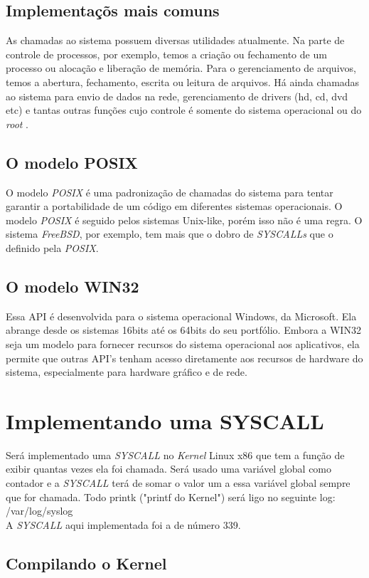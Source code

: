 \documentclass[12pt]{article}
\begin{document}
\subsection{Implementaçõs mais comuns} 
As chamadas ao sistema possuem diversas utilidades atualmente. Na parte de
controle de processos, por exemplo, temos a criação ou fechamento de um
processo ou alocação e liberação de memória. Para o gerenciamento de arquivos,
temos a abertura, fechamento, escrita ou leitura de arquivos. Há ainda chamadas
ao sistema para envio de dados na rede, gerenciamento de drivers (hd, cd, dvd
etc) e tantas outras funções cujo controle é somente do sistema operacional ou
do \textit{root} .

\subsection{O modelo POSIX}
O modelo \textit{POSIX} é uma padronização de chamadas do sistema para tentar garantir a
portabilidade de um código em diferentes sistemas operacionais. O modelo \textit{POSIX} é
seguido pelos sistemas Unix-like, porém isso não é uma regra. O sistema \textit{FreeBSD},
por exemplo, tem mais que o dobro de \textit{SYSCALLs} que o definido pela \textit{POSIX}.

\subsection{O modelo WIN32}
Essa API é desenvolvida para o sistema operacional Windows, da Microsoft. Ela
abrange desde os sistemas 16bits até os 64bits do seu portfólio.
Embora a WIN32 seja um modelo para fornecer recursos do sistema operacional aos
aplicativos, ela permite que outras API's tenham acesso diretamente aos recursos
de hardware do sistema, especialmente para hardware gráfico e de rede.

\section{Implementando uma SYSCALL}
Será implementado uma \textit{SYSCALL} no \textit{Kernel} Linux x86 que tem a função de
exibir quantas vezes ela foi chamada. Será usado uma variável global como
contador e a \textit{SYSCALL} terá de somar o valor um a essa variável global sempre
que for chamada. Todo printk ("printf do Kernel") será ligo no seguinte log: /var/log/syslog\\
A \textit{SYSCALL} aqui implementada foi a de número 339.

\subsection{Compilando o Kernel}
\end{document}
